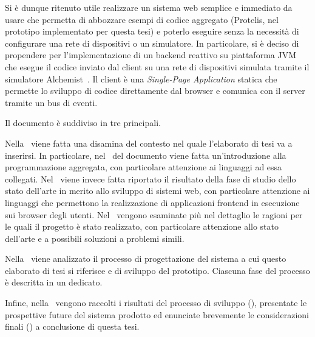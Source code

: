 Si è dunque ritenuto utile realizzare un sistema web semplice e immediato da usare che permetta di abbozzare esempi di codice aggregato
(Protelis, nel prototipo implementato per questa tesi) e poterlo eseguire senza la necessità di configurare una rete di dispositivi o un simulatore.
In particolare, si è deciso di propendere per l'implementazione di un backend reattivo su piattaforma JVM che esegue il codice inviato dal client su una rete di dispositivi simulata tramite il simulatore Alchemist~\cite{alchemist-jos2013}.
Il client è una \emph{Single-Page Application} statica che permette lo sviluppo di codice direttamente dal browser e comunica con il server tramite un bus di eventi.

\medskip

Il documento è suddiviso in tre  principali.

Nella~ viene fatta una disamina del contesto nel quale l'elaborato di tesi va a inserirsi.
In particolare, nel~ del documento viene fatta un'introduzione alla programmazione aggregata, con particolare attenzione ai linguaggi ad essa collegati.
Nel~ viene invece fatta riportato il risultato della fase di studio dello stato dell'arte in merito allo sviluppo di sistemi web,
con particolare attenzione ai linguaggi che permettono la realizzazione di applicazioni frontend in esecuzione sui browser degli utenti.
Nel~ vengono esaminate più nel dettaglio le ragioni per le quali il progetto è stato realizzato,
con particolare attenzione allo stato dell'arte e a possibili soluzioni a problemi simili.

Nella~ viene analizzato il processo di progettazione del sistema a cui questo elaborato di tesi si riferisce e di sviluppo del prototipo.
Ciascuna fase del processo è descritta in un  dedicato.

Infine, nella~ vengono raccolti i risultati del processo di sviluppo (), presentate le prospettive future del sistema prodotto ed enunciate brevemente le considerazioni finali () a conclusione di questa tesi.
